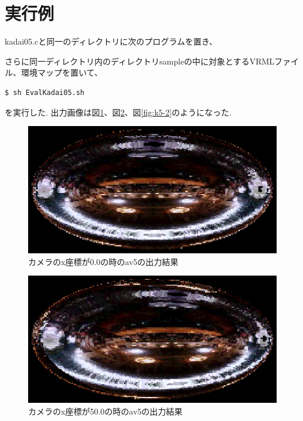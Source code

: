 \documentclass[a4j,dvipdfmx]{jsarticle}
\begin{document}
\section{実行例}
kadai05.cと同一のディレクトリに次のプログラムを置き、

さらに同一ディレクトリ内のディレクトリsampleの中に対象とするVRMLファイル、環境マップを置いて、
\begin{lstlisting}
$ sh EvalKadai05.sh
\end{lstlisting}
を実行した.
出力画像は図\ref{fig:k5-0}、図\ref{fig:k5-1}、図\ref{fig:k5-2}のようになった.
\begin{figure}[hp]
  \begin{center}
    \includegraphics[clip,scale=0.5]{images/Kadai05ForAv5-0.eps}
    \caption{カメラのx座標が0.0の時のav5の出力結果}
    \label{fig:k5-0}
  \end{center}
\end{figure}
\begin{figure}[hp]
  \begin{center}
    \includegraphics[clip,scale=0.5]{images/Kadai05ForAv5-1.eps}
    \caption{カメラのx座標が50.0の時のav5の出力結果}
    \label{fig:k5-1}
  \end{center}
\end{figure}
\end{document}
